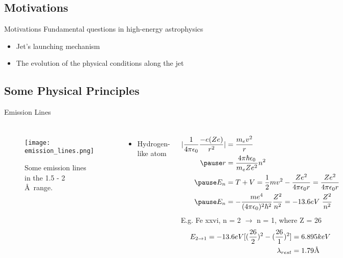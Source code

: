 \documentclass{beamer}
\begin{document}
\subsection{Motivations}
\begin{frame}{Motivations}
    Fundamental questions in high-energy astrophysics
    \begin{itemize}
        \item Jet's launching mechanism
        \item The evolution of the physical conditions along the jet
        \end{itemize}
\end{frame}

\subsection{Some Physical Principles}
\scriptsize
\begin{frame}{Emission Lines}
       \begin{columns}
            \begin{figure}
                \centering
                \texttt{[image: emission\_lines.png]}
                \caption{Some emission lines in the 1.5 - 2 \AA\ range.}
                \label{emission_lines}
            \end{figure}

          \begin{itemize}
              \item Hydrogen-like atom
          \end{itemize}
          \pause
          \begin{align*}
              |\dfrac{1}{4\pi \epsilon_0}\dfrac{-e(Ze)}{r^2}| &= \dfrac{m_ev^2}{r}\\
              \pause
              r &= \dfrac{4\pi\hbar\epsilon_0}{m_{e}Ze^2}n^2\\
              \pause
              E_n &= T + V = \dfrac{1}{2}mv^2 - \dfrac{Ze^2}{4\pi \epsilon_0 r} = \dfrac{Ze^2}{4\pi \epsilon_0 r}\\
              \pause
              E_n &= -\dfrac{me^4}{(4\pi\epsilon_0)^2\hbar^2}\dfrac{Z^2}{n^2} = -13.6 eV\ \dfrac{Z^2}{n^2}
          \end{align*}
          \pause
          E.g. Fe {\sc xxvi}, n = 2 $\rightarrow$ n = 1, where Z = 26
          \pause
          \begin{align*}
              E_{2\rightarrow1} = -13.6 eV [(\dfrac{26}{2})^2 -(\dfrac{26}{1})^2] &= 6.895keV \\
                                \lambda_{rest} &= 1.79 \textsc{\AA}
          \end{align*}
          \end{columns} 
\end{frame}
\end{document}
